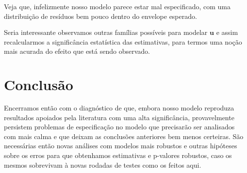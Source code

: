 \documentclass[paper=a4wide, fontsize=10pt]{scrartcl}	 %
\begin{document}
Veja que, infelizmente nosso modelo parece estar mal especificado, com uma distribuição de resíduos bem pouco dentro do envelope esperado.

Seria interessante observamos outras famílias possíveis para modelar \(\mathbf{u}\) e assim recalcularmos a significância estatística das estimativas, para termos uma noção mais acurada do efeito que está sendo observado.
\section{Conclusão}

Encerramos então com o diagnóstico de que, embora nosso modelo reproduza resultados apoiados pela literatura com uma alta significância, provavelmente persistem problemas de especificação no modelo que precisarão ser analisados com mais calma e que deixam as conclusões anteriores bem menos certeiras. São necessárias então novas análises com modelos mais robustos e outras hipóteses sobre os erros para que obtenhamos estimativas e p-valores robustos, caso os mesmos sobrevivam à novas rodadas de testes como os feitos aqui.


\end{document}
